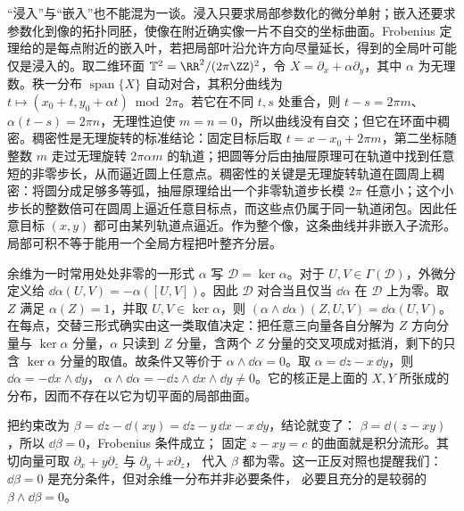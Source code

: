 “浸入”与“嵌入”也不能混为一谈。浸入只要求局部参数化的微分单射；嵌入还要求参数化到像的拓扑同胚，使像在附近确实像一片不自交的坐标曲面。Frobenius 定理给的是每点附近的嵌入叶，若把局部叶沿允许方向尽量延长，得到的全局叶可能仅是浸入的。取二维环面 \(\mathbb T^2=\RR^2/(2\pi\ZZ)^2\)，令
\(X=\partial_x+\alpha\partial_y\)，其中 \(\alpha\) 为无理数。秩一分布 \(\operatorname{span}\{X\}\) 自动对合，其积分曲线为
\(t\mapsto(x_0+t,y_0+\alpha t)\bmod 2\pi\)。若它在不同 \(t,s\) 处重合，则 \(t-s=2\pi m\)、\(\alpha(t-s)=2\pi n\)，无理性迫使 \(m=n=0\)，所以曲线没有自交；但它在环面中稠密。稠密性是无理旋转的标准结论：固定目标后取 \(t=x-x_0+2\pi m\)，第二坐标随整数 \(m\) 走过无理旋转 \(2\pi\alpha m\) 的轨道；把圆等分后由抽屉原理可在轨道中找到任意短的非零步长，从而逼近圆上任意点。稠密性的关键是无理旋转轨道在圆周上稠密：将圆分成足够多等弧，抽屉原理给出一个非零轨道步长模 \(2\pi\) 任意小；这个小步长的整数倍可在圆周上逼近任意目标点，而这些点仍属于同一轨道闭包。因此任意目标 \((x,y)\) 都可由某列轨道点逼近。作为整个像，这条曲线并非嵌入子流形。局部可积不等于能用一个全局方程把叶整齐分层。

余维为一时常用处处非零的一形式 \(\alpha\) 写 \(\mathcal D=\ker\alpha\)。对于 \(U,V\in\Gamma(\mathcal D)\)，外微分定义给
\(\dd\alpha(U,V)=-\alpha([U,V])\)。因此 \(\mathcal D\) 对合当且仅当 \(\dd\alpha\) 在 \(\mathcal D\) 上为零。取 \(Z\) 满足 \(\alpha(Z)=1\)，并取 \(U,V\in\ker\alpha\)，则
\((\alpha\wedge \dd\alpha)(Z,U,V)=\dd\alpha(U,V)\)。在每点，交替三形式确实由这一类取值决定：把任意三向量各自分解为 \(Z\) 方向分量与 \(\ker\alpha\) 分量，\(\alpha\) 只读到 \(Z\) 分量，含两个 \(Z\) 分量的交叉项成对抵消，剩下的只含 \(\ker\alpha\) 分量的取值。故条件又等价于 \(\alpha\wedge \dd\alpha=0\)。取 \(\alpha=\dd z-x\,\dd y\)，则 \(\dd\alpha=-\dd x\wedge \dd y\)，
\(\alpha\wedge \dd\alpha=-\dd z\wedge \dd x\wedge \dd y\ne0\)。它的核正是上面的 \(X,Y\) 所张成的分布，因而不存在以它为切平面的局部曲面。

把约束改为 \(\beta=\dd z-\dd(xy)=\dd z-y\,\dd x-x\,\dd y\)，结论就变了：
\(\beta=\dd(z-xy)\)，所以 \(\dd\beta=0\)，Frobenius 条件成立；
固定 \(z-xy=c\) 的曲面就是积分流形。其切向量可取
\(\partial_x+y\partial_z\) 与 \(\partial_y+x\partial_z\)，
代入 \(\beta\) 都为零。这一正反对照也提醒我们：
\(\dd\beta=0\) 是充分条件，但对余维一分布并非必要条件，
必要且充分的是较弱的 \(\beta\wedge \dd\beta=0\)。



